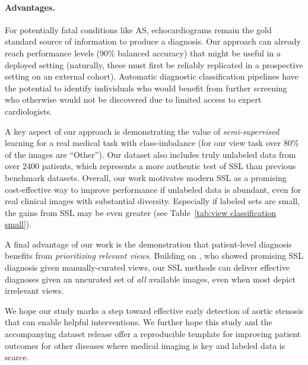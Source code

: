 \paragraph{Advantages.} For potentially fatal conditions like AS, echocardiograms remain the gold standard source of information to produce a diagnosis. Our approach can already reach performance levels (90\% balanced accuracy) that might be useful in a deployed setting (naturally, these must first be reliably replicated in a prospective setting on an external cohort). 
Automatic diagnostic classification pipelines have the potential to identify individuals who would benefit from further screening who otherwise would not be discovered due to limited access to expert cardiologists.

A key aspect of our approach is demonstrating the value of \emph{semi-supervised} learning for a real medical task with class-imbalance (for our view task over 80\% of the images are ``Other'').
Our dataset also includes truly unlabeled data from over 2400 patients, which represents a more authentic test of SSL than previous benchmark datasets.
Overall, our work motivates modern SSL as a promising cost-effective way to improve performance if unlabeled data is abundant, even for real clinical images with substantial diversity.
Especially if labeled sets are small, the gains from SSL may be even greater (see Table~\ref{tab:view classification small}). 


A final advantage of our work is the demonstration that patient-level diagnosis benefits from \emph{prioritizing relevant views}. Building on \citet{madaniDeepEchocardiographyDataefficient2018}, who showed promising SSL diagnosis given manually-curated views, our SSL methods can deliver effective diagnoses given an uncurated set of \emph{all} available images, even when most depict irrelevant views.

We hope our study marks a step toward effective early detection of aortic stenosis that can enable helpful interventions. We further hope this study and the accompanying dataset release offer a reproducible template for improving patient outcomes for other diseases where medical imaging is key and labeled data is scarce.

